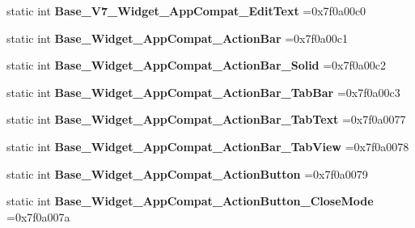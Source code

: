 \begin{DoxyCompactItemize}
static int {\bfseries Base\+\_\+\+V7\+\_\+\+Widget\+\_\+\+App\+Compat\+\_\+\+Edit\+Text} =0x7f0a00c0
\item 
\mbox{\label{classandroid_1_1support_1_1v7_1_1mediarouter_1_1R_1_1style_aa76392d3555c8e0d9ffb2a5b348e6135}} 
static int {\bfseries Base\+\_\+\+Widget\+\_\+\+App\+Compat\+\_\+\+Action\+Bar} =0x7f0a00c1
\item 
\mbox{\label{classandroid_1_1support_1_1v7_1_1mediarouter_1_1R_1_1style_a6866c587868648077fc5d65589f1e213}} 
static int {\bfseries Base\+\_\+\+Widget\+\_\+\+App\+Compat\+\_\+\+Action\+Bar\+\_\+\+Solid} =0x7f0a00c2
\item 
\mbox{\label{classandroid_1_1support_1_1v7_1_1mediarouter_1_1R_1_1style_acd10aaf664f1fa448a034ba7df75e58c}} 
static int {\bfseries Base\+\_\+\+Widget\+\_\+\+App\+Compat\+\_\+\+Action\+Bar\+\_\+\+Tab\+Bar} =0x7f0a00c3
\item 
\mbox{\label{classandroid_1_1support_1_1v7_1_1mediarouter_1_1R_1_1style_ac3484ef03261897d87dcbe484654f1cd}} 
static int {\bfseries Base\+\_\+\+Widget\+\_\+\+App\+Compat\+\_\+\+Action\+Bar\+\_\+\+Tab\+Text} =0x7f0a0077
\item 
\mbox{\label{classandroid_1_1support_1_1v7_1_1mediarouter_1_1R_1_1style_a4a4484bc28cc7dc0e3f419ace8199ba4}} 
static int {\bfseries Base\+\_\+\+Widget\+\_\+\+App\+Compat\+\_\+\+Action\+Bar\+\_\+\+Tab\+View} =0x7f0a0078
\item 
\mbox{\label{classandroid_1_1support_1_1v7_1_1mediarouter_1_1R_1_1style_aa8464034caab01cd8d587a64a8c727ac}} 
static int {\bfseries Base\+\_\+\+Widget\+\_\+\+App\+Compat\+\_\+\+Action\+Button} =0x7f0a0079
\item 
\mbox{\label{classandroid_1_1support_1_1v7_1_1mediarouter_1_1R_1_1style_a15e5d73f227be024e7878ff5d3ad7c6b}} 
static int {\bfseries Base\+\_\+\+Widget\+\_\+\+App\+Compat\+\_\+\+Action\+Button\+\_\+\+Close\+Mode} =0x7f0a007a

\end{DoxyCompactItemize}
